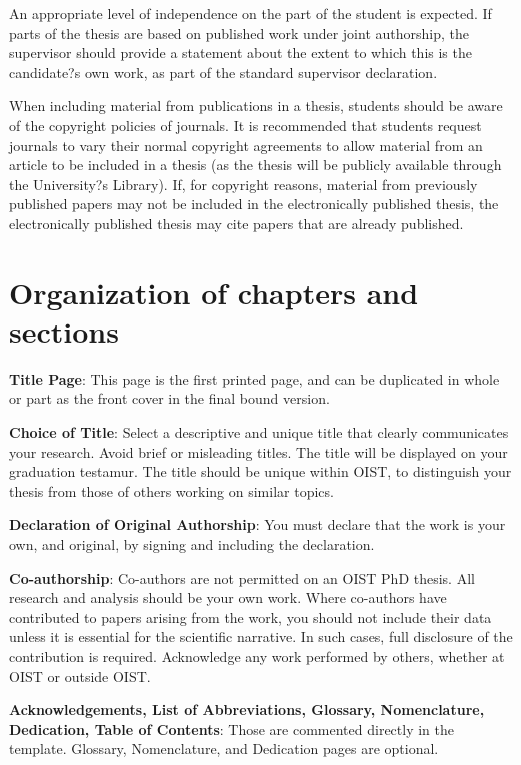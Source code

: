An appropriate level of independence on the part of the student is expected. If parts of the thesis are based on published work under joint authorship, the supervisor should provide a statement about the extent to which this is the candidate?s own work, as part of the standard supervisor declaration. 

When including material from publications in a thesis, students should be aware of the copyright policies of journals. It is recommended that students request journals to vary their normal copyright agreements to allow material from an article to be included in a thesis (as the thesis will be publicly available through the University?s Library). If, for copyright reasons, material from previously published papers may not be included in the electronically published thesis, the electronically published thesis may cite papers that are already published. 

\section{Organization of chapters and sections}

\textbf{Title Page}:  This page is the first printed page, and can be duplicated in whole or part as the front cover in the final bound version.

\textbf{Choice of Title}: Select a descriptive and unique title that clearly communicates your research.  Avoid brief or misleading titles.  The title will be displayed on your graduation testamur.  The title should be unique within OIST, to distinguish your thesis from those of others working on similar topics.

\textbf{Declaration of Original Authorship}:  You must declare that the work is your own, and original,  by signing and including the declaration.  

\textbf{Co-authorship}:  Co-authors are not permitted on an OIST PhD thesis. All research and analysis should be your own work. Where co-authors have contributed to papers arising from the work, you should not include their data unless it is essential for the scientific narrative.  In such cases, full disclosure of the contribution is required. Acknowledge any work performed by others, whether at OIST or outside OIST.

\textbf{Acknowledgements, List of Abbreviations, Glossary, Nomenclature, Dedication, Table of Contents}: Those are commented directly in the template. Glossary, Nomenclature, and Dedication pages are optional.


